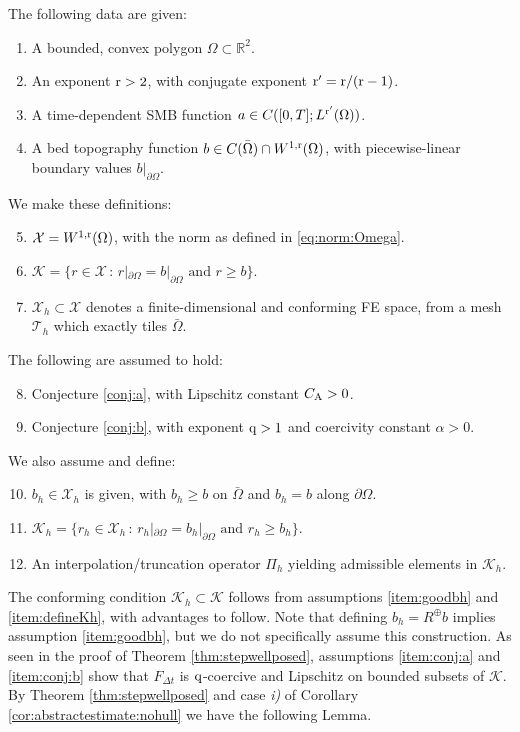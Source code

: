 \documentclass[hidelinks,onefignum,onetabnum,final]{siamart220329}  %
\newcommand{\RR}{\mathbb{R}}
\newcommand{\cK}{\mathcal{K}}
\newcommand{\cT}{\mathcal{T}}
\newcommand{\cX}{\mathcal{X}}
\newcommand{\qq}{{\text{\textnormal{q}}}}
\newcommand{\rr}{{\text{\textnormal{r}}}}
\newcommand{\CA}{C_\text{\textnormal{A}}}
\begin{document}
\smallskip
\begin{assumptions}
The following data are given:
\begin{enumerate}
\item A bounded, convex polygon $\Omega\subset\RR^2$.
\item An exponent $\rr > 2$, with conjugate exponent $\rr' = \rr/(\rr-1)$. \label{item:rr}
\item A time-dependent SMB function $a\in C([0,T]; L^{\rr'}(\Omega))$.
\item A bed topography function $b \in C(\bar\Omega) \cap W^{1,\rr}(\Omega)$, with piecewise-linear boundary values $b|_{\partial\Omega}$.
\end{enumerate}
We make these definitions:
\begin{enumerate}
\setcounter{enumi}{4}
\item $\cX = W^{1,\rr}(\Omega)$, with the norm as defined in \eqref{eq:norm:Omega}.
\item $\cK = \{r\in\cX\,:\,r|_{\partial \Omega} = b|_{\partial \Omega} \text{ and } r \ge b\}$.
\item $\cX_h \subset \cX$ denotes a finite-dimensional and conforming FE space, from a mesh $\cT_h$ which exactly tiles $\bar\Omega$.
\end{enumerate}
The following are assumed to hold:
\begin{enumerate}
\setcounter{enumi}{7}
\item Conjecture \ref{conj:a}, with Lipschitz constant $\CA > 0$. \label{item:conj:a}
\item Conjecture \ref{conj:b}, with exponent $\qq>1$ and coercivity constant $\alpha > 0$.\label{item:conj:b}
\end{enumerate}
We also assume and define:
\begin{enumerate}
\setcounter{enumi}{9}
\item $b_h\in\cX_h$ is given, with $b_h\ge b$ on $\bar\Omega$ and $b_h=b$ along $\partial \Omega$. \label{item:goodbh}
\item $\cK_h = \{r_h\in\cX_h\,:\,r_h|_{\partial \Omega} = b_h|_{\partial \Omega} \text{ and } r_h \ge b_h\}$. \label{item:defineKh}
\item An interpolation/truncation operator $\Pi_h$ yielding admissible elements in $\cK_h$.  \label{item:Pi}
\end{enumerate}
\end{assumptions}

\medskip
The conforming condition $\cK_h\subset \cK$ follows from assumptions \ref{item:goodbh} and \ref{item:defineKh}, with advantages to follow.  Note that defining $b_h=R^{\oplus} b$ implies assumption \ref{item:goodbh}, but we do not specifically assume this construction.  As seen in the proof of Theorem \ref{thm:stepwellposed}, assumptions \ref{item:conj:a} and \ref{item:conj:b} show that $F_{\Delta t}$ is $\qq$-coercive and Lipschitz on bounded subsets of $\cK$.  By Theorem \ref{thm:stepwellposed} and case \emph{i)} of Corollary \ref{cor:abstractestimate:nohull} we have the following Lemma.
\end{document}
